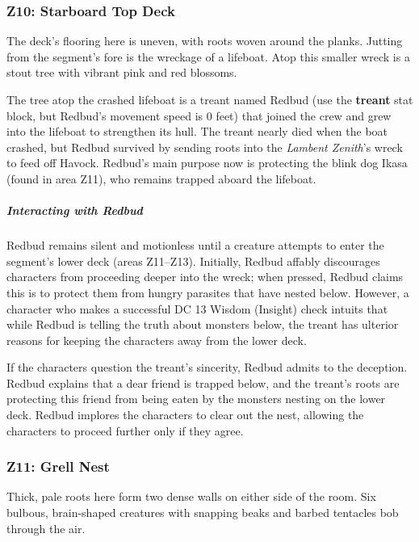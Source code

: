 \documentclass[10pt,a4paper,twoside,bg=print,twocolumn,openany,nodeprecatedcode]{dndbook}
\begin{document}
\subsubsection{Z10: Starboard Top Deck}
\begin{DndReadAloud}{}
The deck's flooring here is uneven, with roots woven around the planks. Jutting from the segment's fore is the wreckage of a lifeboat. Atop this smaller wreck is a stout tree with vibrant pink and red blossoms.

\end{DndReadAloud}

The tree atop the crashed lifeboat is a treant named Redbud (use the \textbf{treant} stat block, but Redbud's movement speed is 0 feet) that joined the crew and grew into the lifeboat to strengthen its hull. The treant nearly died when the boat crashed, but Redbud survived by sending roots into the \textit{Lambent Zenith}'s wreck to feed off Havock. Redbud's main purpose now is protecting the blink dog Ikasa (found in area Z11), who remains trapped aboard the lifeboat.

\subparagraph{Interacting with Redbud}
Redbud remains silent and motionless until a creature attempts to enter the segment's lower deck (areas Z11–Z13). Initially, Redbud affably discourages characters from proceeding deeper into the wreck; when pressed, Redbud claims this is to protect them from hungry parasites that have nested below. However, a character who makes a successful DC 13 Wisdom (Insight) check intuits that while Redbud is telling the truth about monsters below, the treant has ulterior reasons for keeping the characters away from the lower deck.

If the characters question the treant's sincerity, Redbud admits to the deception. Redbud explains that a dear friend is trapped below, and the treant's roots are protecting this friend from being eaten by the monsters nesting on the lower deck. Redbud implores the characters to clear out the nest, allowing the characters to proceed further only if they agree.

\subsubsection{Z11: Grell Nest}
\begin{DndReadAloud}{}
Thick, pale roots here form two dense walls on either side of the room. Six bulbous, brain-shaped creatures with snapping beaks and barbed tentacles bob through the air.

\end{DndReadAloud}
\end{document}
